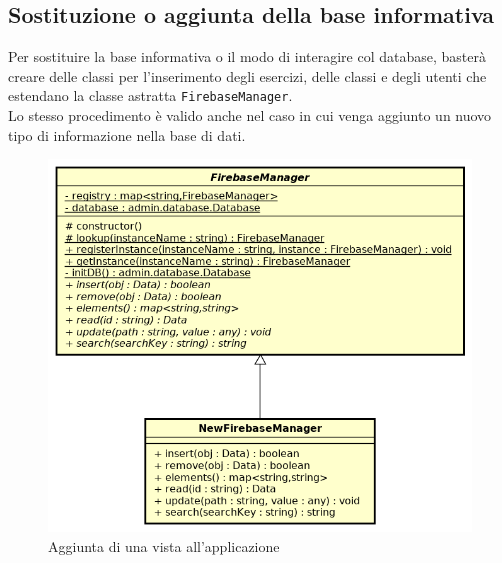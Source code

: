 \subsection{Sostituzione o aggiunta della base informativa}
Per sostituire la base informativa o il modo di interagire col database, basterà creare delle classi per l'inserimento degli esercizi, delle classi e degli utenti che estendano la classe astratta \texttt{FirebaseManager}.\\
Lo stesso procedimento è valido anche nel caso in cui venga aggiunto un nuovo tipo di informazione nella base di dati.
\begin{figure}[ht]
	\centering
	\includegraphics[scale=0.75]{images/newfirebasemanager.png}
	\caption{Aggiunta di una vista all'applicazione}
\end{figure}